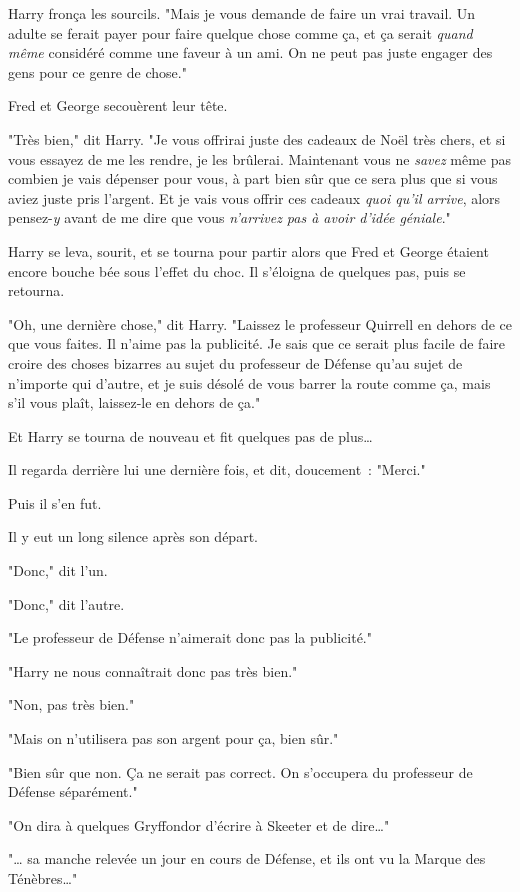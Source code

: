 Harry fronça les sourcils. "Mais je vous demande de faire un vrai travail. Un adulte se ferait payer pour faire quelque chose comme ça, et ça serait \emph{quand même} considéré comme une faveur à un ami. On ne peut pas juste engager des gens pour ce genre de chose."

Fred et George secouèrent leur tête.

"Très bien," dit Harry. "Je vous offrirai juste des cadeaux de Noël très chers, et si vous essayez de me les rendre, je les brûlerai. Maintenant vous ne \emph{savez} même pas combien je vais dépenser pour vous, à part bien sûr que ce sera plus que si vous aviez juste pris l'argent. Et je vais vous offrir ces cadeaux \emph{quoi qu'il arrive}, alors pensez-\emph{y} avant de me dire que vous \emph{n'arrivez pas à avoir d'idée géniale}."

Harry se leva, sourit, et se tourna pour partir alors que Fred et George étaient encore bouche bée sous l'effet du choc. Il s'éloigna de quelques pas, puis se retourna.

"Oh, une dernière chose," dit Harry. "Laissez le professeur Quirrell en dehors de ce que vous faites. Il n'aime pas la publicité. Je sais que ce serait plus facile de faire croire des choses bizarres au sujet du professeur de Défense qu'au sujet de n'importe qui d'autre, et je suis désolé de vous barrer la route comme ça, mais s'il vous plaît, laissez-le en dehors de ça."

Et Harry se tourna de nouveau et fit quelques pas de plus…

Il regarda derrière lui une dernière fois, et dit, doucement~: "Merci."

Puis il s'en fut.

Il y eut un long silence après son départ.

"Donc," dit l'un.

"Donc," dit l'autre.

"Le professeur de Défense n'aimerait donc pas la publicité."

"Harry ne nous connaîtrait donc pas très bien."

"Non, pas très bien."

"Mais on n'utilisera pas son argent pour ça, bien sûr."

"Bien sûr que non. Ça ne serait pas correct. On s'occupera du professeur de Défense séparément."

"On dira à quelques Gryffondor d'écrire à Skeeter et de dire…"

"… sa manche relevée un jour en cours de Défense, et ils ont vu la Marque des Ténèbres…"

